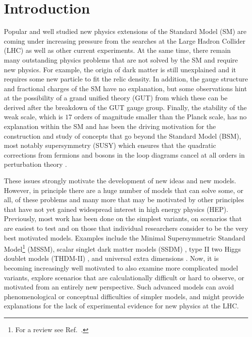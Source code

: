 \documentclass[final,3p,11pt,pdflatex]{elsarticle}
\begin{document}
\clearpage
\tableofcontents

\newpage
\section{Introduction}

Popular and well studied new physics extensions of the Standard Model
(SM) are coming under increasing pressure from the searches at the
Large Hadron Collider (LHC) as well as other current experiments.  At
the same time, there remain many outstanding physics problems that are
not solved by the SM and require new physics.  For example, the origin
of dark matter is still unexplained and it requires some new particle
to fit the relic density.  In addition, the gauge structure and
fractional charges of the SM have no explanation, but some
observations hint at the possibility of a grand unified theory (GUT)
from which these can be derived after the breakdown of the GUT gauge
group.  Finally, the stability of the weak scale, which is $17$ orders
of magnitude smaller than the Planck scale, has no explanation within
the SM \cite{Weinberg:1975gm, Weinberg:1979bn,
  Gildener:1976ai,Susskind:1978ms, tHooft:1980xss} and has been the
driving motivation for the construction and study of concepts that go
beyond the Standard Model (BSM), most notably supersymmetry (SUSY) \cite{Miyazawa:1966mfa,Miyazawa:1968zz,Ramond:1971gb,Golfand:1971iw,Gervais:1971ji,Neveu:1971rx,Neveu:1971iv,Volkov:1973ix,Wess:1973kz,Wess:1974tw,Salam:1974yz} which ensures that the quadratic corrections from fermions and bosons in the loop diagrams cancel at all orders in perturbation theory \cite{Dimopoulos:1981au,Witten:1981nf,Dine:1981za,Dimopoulos:1981zb,Kaul:1981hi}.

These issues strongly motivate the development of new ideas and new
models.  However, in principle there are a huge number of models that
can solve some, or all, of these problems and many more that may be
motivated by other principles that have not yet gained widespread
interest in high energy physics (HEP)\@. Previously, most work has
been done on the simplest variants, on scenarios that are easiest to
test and on those that individual researchers consider to be the very
best motivated models. Examples include the Minimal Supersymmetric
Standard Model\footnote{For a review see Ref.\ \cite{Chung:2003fi}.}
(MSSM), scalar singlet dark matter models (SSDM)
\cite{Silveira:1985rk,McDonald:1993ex,Burgess:2000yq}, type II two
Higgs doublet models (THDM-II) \cite{Lee:1973iz,Glashow:1976nt,
  Donoghue:1978cj}, and universal extra dimensions
\cite{Appelquist:2000nn}.  Now, it is becoming increasingly well
motivated to also examine more complicated model variants, explore
scenarios that are calculationally difficult or hard to observe, or
motivated from an entirely new perspective.  Such advanced models can
avoid phenomenological or conceptual difficulties of simpler models,
and might provide explanations for the lack of experimental evidence
for new physics at the LHC.
\end{document}
